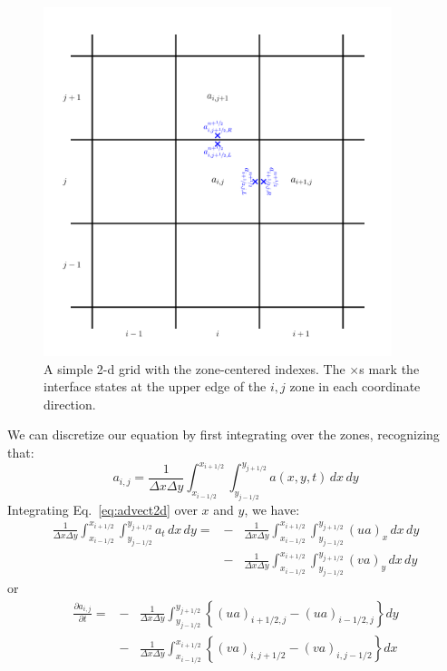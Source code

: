 \begin{figure}[h]
\centering
\includegraphics[width=4.0in]{2dgrid}
\caption[A 2-d grid with zone-centered indexes.]{\label{fig:2dgrid} A
  simple 2-d grid with the zone-centered indexes.  The $\times$s mark
  the interface states at the upper edge of the $i,j$ zone in each
  coordinate direction.}
\end{figure}

We can discretize our equation by first integrating over the zones, 
recognizing that:
\begin{equation}
a_{i,j} = \frac{1}{\Delta x \Delta y} 
   \int_{x_{i-1/2}}^{x_{i+1/2}} \int_{y_{j-1/2}}^{y_{j+1/2}} 
   a(x,y,t) \, dx \, dy
\end{equation}
Integrating Eq.~\ref{eq:advect2d} over $x$ and $y$, we have:
\begin{eqnarray}
\frac{1}{\Delta x \Delta y} 
  \int_{x_{i-1/2}}^{x_{i+1/2}} 
  \int_{y_{j-1/2}}^{y_{j+1/2}} a_t \, dx \, dy =  
  &-& \frac{1}{\Delta x \Delta y}
       \int_{x_{i-1/2}}^{x_{i+1/2}} \int_{y_{j-1/2}}^{y_{j+1/2}}
      (u a)_x \, dx \, dy \nonumber \\
  &-& \frac{1}{\Delta x \Delta y}
       \int_{x_{i-1/2}}^{x_{i+1/2}} \int_{y_{j-1/2}}^{y_{j+1/2}}
      (v a)_y \, dx \, dy 
\end{eqnarray}
or
\begin{eqnarray}
 \frac{\partial a_{i,j}}{\partial t} =
  &-& \frac{1}{\Delta x\Delta y} \int_{y_{j-1/2}}^{y_{j+1/2}}
     \left \{ (u a)_{i+1/2,j} - (u a)_{i-1/2,j} \right \} dy \nonumber \\
  &-& \frac{1}{\Delta x\Delta y} \int_{x_{i-1/2}}^{x_{i+1/2}}
     \left \{ (v a)_{i,j+1/2} - (v a)_{i,j-1/2} \right \} dx
\end{eqnarray}

